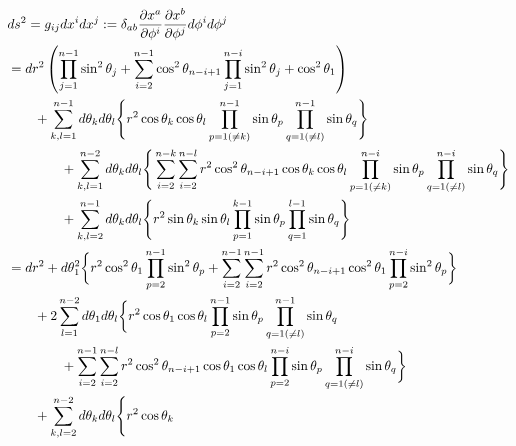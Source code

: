 \begin{align}
    &
    ds^2
=
    g_{ij} dx^i dx^j
:=
    \delta_{ab}
    \dfrac{\partial x^a}{\partial \phi^i}
    \dfrac{\partial x^b}{\partial \phi^j}
    d \phi^i d\phi^j
\notag\\&
=
    d r^2
    \left(
        \prod_{j=1}^{n - 1}
        \sin^2 \theta_j
    +
    \sum_{i = 2}^{n-1}
        \cos^2 \theta_{n - i + 1}
        \prod_{j=1}^{n - i}
        \sin^2 \theta_j
    +
        \cos^2 \theta_{1}
    \right)
\notag\\&\qquad
    +
    \sum_{k, l = 1}^{n - 1}
    d \theta_k
    d \theta_l
    \Bigg\{
        r^2 \cos \theta_k
        \cos \theta_l
        \prod_{p=1 (\neq k)}^{n-1}
        \sin \theta_p
        \prod_{q=1 (\neq l)}^{n-1}
        \sin \theta_q
    \Bigg\}
\notag\\&\qquad\qquad
    +
    \sum_{k, l = 1}^{n - 2}
    d \theta_k
    d \theta_l
    \Bigg\{
    \sum_{i = 2}^{n - k}
    \sum_{i = 2}^{n - l}
        r^2 \cos^2 \theta_{n - i + 1}
        \cos \theta_k
        \cos \theta_l
        \prod_{p=1 (\neq k)}^{n - i}
        \sin \theta_p
        \prod_{q=1 (\neq l)}^{n - i}
        \sin \theta_q
    \Bigg\}
\notag\\&\qquad\qquad
    +
    \sum_{k, l = 2}^{n - 1}
    d \theta_k
    d \theta_l
    \Bigg\{
        r^2 \sin \theta_{k}
        \sin \theta_{l}
        \prod_{p=1}^{k - 1}
        \sin \theta_p
        \prod_{q=1}^{l - 1}
        \sin \theta_q
    \Bigg\}
\notag\\&
=
    d r^2
    +
    d \theta_1^2
    \bigg\{
        r^2 \cos^2 \theta_1
        \prod_{p=2}^{n-1}
        \sin^2 \theta_p
    +
    \sum_{i = 2}^{n - 1}
    \sum_{i = 2}^{n - 1}
        r^2 \cos^2 \theta_{n - i + 1}
        \cos^2 \theta_1
        \prod_{p=2}^{n - i}
        \sin^2 \theta_p
    \bigg\}
\notag\\&\qquad
    +
    2 \sum_{l = 1}^{n - 2}
    d \theta_1 d \theta_l
    \bigg\{
        r^2 \cos \theta_1
        \cos \theta_l
        \prod_{p=2}^{n-1}
        \sin \theta_p
        \prod_{q=1 (\neq l)}^{n-1}
        \sin \theta_q
\notag\\&\qquad\qquad
    +
    \sum_{i = 2}^{n - 1}
    \sum_{i = 2}^{n - l}
        r^2 \cos^2 \theta_{n - i + 1}
        \cos \theta_1
        \cos \theta_l
        \prod_{p=2}^{n - i}
        \sin \theta_p
        \prod_{q=1 (\neq l)}^{n - i}
        \sin \theta_q
    \bigg\}
\notag\\&\qquad
    +
    \sum_{k, l=2}^{n - 2}
    d \theta_k
    d \theta_l
    \Bigg\{
        r^2 \cos \theta_k

\end{align}
